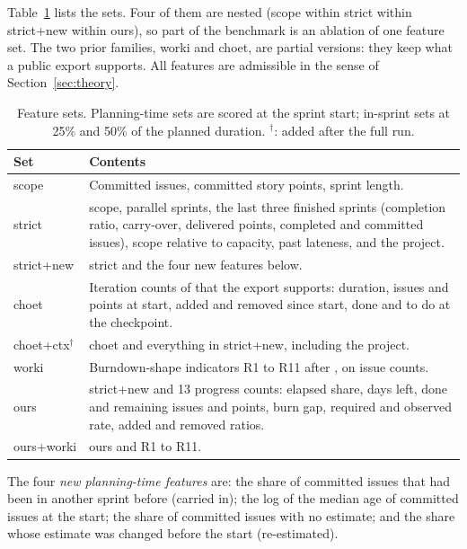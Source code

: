 \documentclass[journal]{IEEEtran}
\begin{document}
Table~\ref{tab:families} lists the sets. Four of them are nested (scope within strict within strict+new within ours), so part of the benchmark is an ablation of one feature set. The two prior families, worki and choet, are partial versions: they keep what a public export supports. All features are admissible in the sense of Section~\ref{sec:theory}.

\begin{table}[t]
\centering
\small
\caption{Feature sets. Planning-time sets are scored at the sprint start; in-sprint sets at 25\% and 50\% of the planned duration. $^{\dagger}$: added after the full run.}
\label{tab:families}
\begin{tabular}{@{}p{1.6cm}p{6.3cm}@{}}
\toprule
Set & Contents \\
\midrule
scope & Committed issues, committed story points, sprint length. \\
strict & scope, parallel sprints, the last three finished sprints (completion ratio, carry-over, delivered points, completed and committed issues), scope relative to capacity, past lateness, and the project. \\
strict+new & strict and the four new features below. \\
choet & Iteration counts of \cite{choet2018} that the export supports: duration, issues and points at start, added and removed since start, done and to do at the checkpoint. \\
choet+ctx$^{\dagger}$ & choet and everything in strict+new, including the project. \\
worki & Burndown-shape indicators R1 to R11 after \cite{perez2024}, on issue counts. \\
ours & strict+new and 13 progress counts: elapsed share, days left, done and remaining issues and points, burn gap, required and observed rate, added and removed ratios. \\
ours+worki & ours and R1 to R11. \\
\bottomrule
\end{tabular}
\end{table}

The four \emph{new planning-time features} are: the share of committed issues that had been in another sprint before (carried in); the log of the median age of committed issues at the start; the share of committed issues with no estimate; and the share whose estimate was changed before the start (re-estimated).
\end{document}
